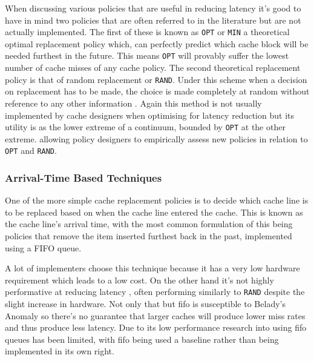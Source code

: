 When discussing various policies that are useful in reducing latency it's good to have in mind two policies that are often referred to in the literature but are not actually implemented. The first of these is known as \texttt{OPT} or \texttt{MIN} \cite{jeongOptimalReplacementsCaches1999} a theoretical optimal replacement policy which, can perfectly predict which cache block will be needed furthest in the future. This means \texttt{OPT} will provably suffer the lowest number of cache misses of any cache policy. The second theoretical replacement policy is that of random replacement or \texttt{RAND}. Under this scheme when a decision on replacement has to be made, the choice is made completely at random without reference to any other information \cite{beladyStudyReplacementAlgorithms1966}. Again this method is not usually implemented by cache designers when optimising for latency reduction \cite{karedlaCachingStrategiesImprove1994} but its utility is as the lower extreme of a continuum, bounded by \texttt{OPT} at the other extreme. allowing policy designers to empirically assess new policies in relation to \texttt{OPT} and \texttt{RAND}.

\subsubsection{Arrival-Time Based Techniques}

One of the more simple cache replacement policies is to decide which cache line is to be replaced based on when the cache line entered the cache. This is known as the cache line's arrival time, with the most common formulation of this being policies that remove the item inserted furthest back in the past, implemented using a FIFO queue.

A lot of implementers choose this technique because it has a very low hardware requirement \cite{pandaSurveyReplacementStrategies2016} which leads to a low cost. On the other hand it's not highly performative at reducing latency \cite{al-zoubiPerformanceEvaluationCache2004, tsaoMultiFactorPagingExperiment1972}, often performing similarly to \texttt{RAND} despite the slight increase in hardware. Not only that but \gls{fifo} is susceptible to Belady's Anomaly \cite{beladyAnomalySpacetimeCharacteristics1969} so there's no guarantee that larger caches will produce lower miss rates and thus produce less latency. Due to its low performance research into using \gls{fifo} queues has been limited, with \gls{fifo} being used a baseline \cite{faresPerformanceEvaluationTraditional2012} rather than being implemented in its own right.

